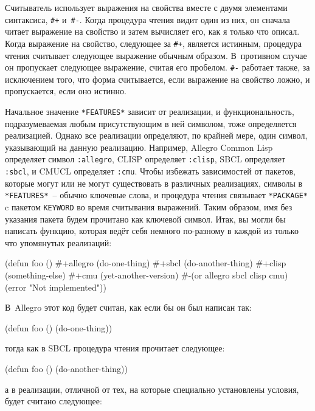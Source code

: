 Считыватель использует выражения на свойства вместе с двумя элементами синтаксиса,
\lstinline!#+! и~\lstinline!#-!. Когда процедура чтения видит один из них, он сначала читает
выражение на свойство и затем вычисляет его, как я только что описал. Когда выражение на
свойство, следующее за \lstinline!#+!, является истинным, процедура чтения считывает следующее
выражение обычным образом. В~противном случае он пропускает следующее выражение, считая
его пробелом. \lstinline!#-! работает также, за исключением того, что форма считывается,
если выражение на свойство ложно, и пропускается, если оно истинно.

Начальное значение \lstinline{*FEATURES*} зависит от реализации, и функциональность,
подразумеваемая любым присутствующим в ней символом, тоже определяется реализацией. Однако
все реализации определяют, по крайней мере, один символ, указывающий на данную реализацию.
Например, Allegro Common Lisp определяет символ \lstinline{:allegro}, CLISP определяет
\lstinline{:clisp}, SBCL определяет \lstinline{:sbcl}, и CMUCL определяет
\lstinline{:cmu}.  Чтобы избежать зависимостей от пакетов, которые могут или не могут
существовать в различных реализациях, символы в \lstinline{*FEATURES*}~-- обычно ключевые
слова, и процедура чтения связывает \lstinline{*PACKAGE*} c пакетом \lstinline{KEYWORD} во
время считывания выражений. Таким образом, имя без указания пакета будем прочитано как
ключевой символ. Итак, вы могли бы написать функцию, которая ведёт себя немного по-разному
в каждой из только что упомянутых реализаций:

\begin{myverb}
(defun foo ()
  #+allegro (do-one-thing)
  #+sbcl (do-another-thing)
  #+clisp (something-else)
  #+cmu (yet-another-version)
  #-(or allegro sbcl clisp cmu) (error "Not implemented"))
\end{myverb}

\noindent{}В~Allegro этот код будет считан, как если бы он был написан так:

\begin{myverb}
(defun foo ()
  (do-one-thing))
\end{myverb}

\noindent{}тогда как в SBCL процедура чтения прочитает следующее:

\begin{myverb}
(defun foo ()
  (do-another-thing))
\end{myverb}

\noindent{}а в реализации, отличной от тех, на которые специально установлены условия, будет считано
следующее:


